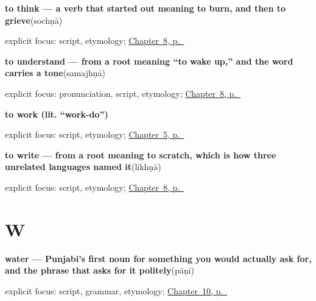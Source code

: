 \noindent\begin{minipage}[t]{\linewidth}
\raggedright
\textbf{to think — a verb that started out meaning to burn, and then to grieve}\enspace\emph{}\enspace(sochṇā)\par
\footnotesize explicit focus: script, etymology; \hyperref[ch:pa-mind-and-tone]{Chapter~8, p.~\pageref*{ch:pa-mind-and-tone}}
\end{minipage}\par\smallskip

\noindent\begin{minipage}[t]{\linewidth}
\raggedright
\textbf{to understand — from a root meaning “to wake up,” and the word carries a tone}\enspace\emph{}\enspace(samajhṇā)\par
\footnotesize explicit focus: pronunciation, script, etymology; \hyperref[ch:pa-mind-and-tone]{Chapter~8, p.~\pageref*{ch:pa-mind-and-tone}}
\end{minipage}\par\smallskip

\noindent\begin{minipage}[t]{\linewidth}
\raggedright
\textbf{to work (lit. \textquotedblleft{}work-do\textquotedblright{})}\enspace\emph{ }\par
\footnotesize explicit focus: script, etymology; \hyperref[ch:first-verbs]{Chapter~5, p.~\pageref*{ch:first-verbs}}
\end{minipage}\par\smallskip

\noindent\begin{minipage}[t]{\linewidth}
\raggedright
\textbf{to write — from a root meaning to scratch, which is how three unrelated languages named it}\enspace\emph{}\enspace(likhṇā)\par
\footnotesize explicit focus: script, etymology; \hyperref[ch:pa-mind-and-tone]{Chapter~8, p.~\pageref*{ch:pa-mind-and-tone}}
\end{minipage}\par\smallskip

\section*{W}

\noindent\begin{minipage}[t]{\linewidth}
\raggedright
\textbf{water — Punjabi's first noun for something you would actually ask for, and the phrase that asks for it politely}\enspace\emph{}\enspace(pāṇī)\par
\footnotesize explicit focus: script, grammar, etymology; \hyperref[ch:pa-request-food-drink]{Chapter~10, p.~\pageref*{ch:pa-request-food-drink}}
\end{minipage}\par\smallskip

